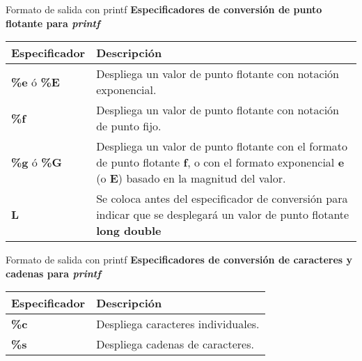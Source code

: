 \begin{frame}[t]{Formato de salida con printf}
\textbf{Especificadores de conversi\'on de punto flotante para \textit{printf}}\\ \vspace{5mm}
\scriptsize
\centering
\begin{tabular}{lp{7.5cm}}
	\toprule
	\textbf{Especificador} & \textbf{Descripción}\\
	\midrule 
	\textbf{\%e} \'o \textbf{\%E} & Despliega un valor de punto flotante con notaci\'on exponencial.\\
	\textbf{\%f} & Despliega un valor de punto flotante con notaci\'on de punto fijo.\\
	\textbf{\%g} \'o \textbf{\%G} & Despliega un valor de punto flotante con el formato de punto flotante \textbf{f}, o con el formato exponencial \textbf{e} (o \textbf{E}) basado en la magnitud del valor. \\
	\textbf{L} & Se coloca antes del especificador de conversión para indicar que se desplegar\'a un valor de punto flotante \textbf{long double}\\ 
	\bottomrule
\end{tabular}
\end{frame}

\begin{frame}[t]{Formato de salida con printf}
\textbf{Especificadores de conversión de caracteres y cadenas para \textit{printf}}\\ \vspace{5mm}
\centering
\begin{tabular}{lp{7.5cm}}
	\toprule
	\textbf{Especificador} & \textbf{Descripci\'on}\\
	\midrule
	\textbf{\%c} & Despliega caracteres individuales.\\
	\textbf{\%s} & Despliega cadenas de caracteres. \\
	\bottomrule
\end{tabular}
\end{frame}

